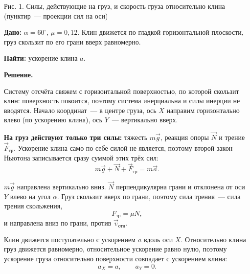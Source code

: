 \documentclass{minimal}
\begin{document}
\begin{center}

    Рис. 1. Силы, действующие на груз, и скорость груза относительно клина (пунктир~— проекции сил на оси)
    \end{center}

    \textbf{Дано:} \(\alpha = 60^\circ\), \(\mu = 0{,}12\). Клин движется по гладкой горизонтальной плоскости, груз скользит по его грани вверх равномерно.

    \textbf{Найти:} ускорение клина \(a\).

    \textbf{Решение.}

    Систему отсчёта свяжем с горизонтальной поверхностью, по которой скользит клин: поверхность покоится, поэтому система инерциальна и силы инерции не вводятся. Начало координат~— в центре груза, ось \(X\) направим горизонтально влево (по ускорению клина), ось \(Y\)~— вертикально вверх.

    \textbf{На груз действуют только три силы:} тяжесть \(m\vec{g}\), реакция опоры \(\vec{N}\) и трение \(\vec{F}_{\text{тр}}\). Ускорение клина само по себе силой не является, поэтому второй закон Ньютона записывается сразу суммой этих трёх сил:
    \[
        m\vec{g} + \vec{N} + \vec{F}_{\text{тр}} = m\vec{a}.
    \]

    \(m\vec{g}\) направлена вертикально вниз. \(\vec{N}\) перпендикулярна грани и отклонена от оси \(Y\) влево на угол \(\alpha\). Груз скользит вверх по грани, поэтому сила трения~— сила трения скольжения,
    \[
        F_{\text{тр}} = \mu N,
    \]
    и направлена вниз по грани, против \(\vec{v}_{\text{отн}}\).

    Клин движется поступательно с ускорением \(a\) вдоль оси \(X\). Относительно клина груз движется равномерно, относительное ускорение равно нулю, поэтому ускорение груза относительно поверхности совпадает с ускорением клина:
    \[
        a_X = a, \qquad a_Y = 0.
    \]
\end{document}
